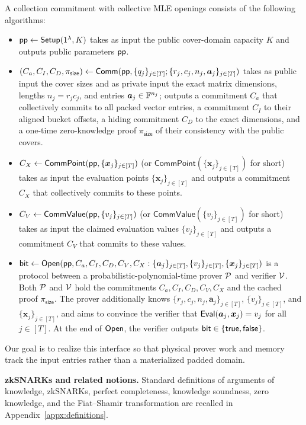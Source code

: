 \begin{definition}
\label{def:collectioncommit}
A collection commitment with collective MLE openings consists of the following
algorithms:
\begin{itemize}[leftmargin=*, labelsep=0.5em]
\item ${\sf pp} \leftarrow {\sf Setup}(1^\lambda, K)$
takes as input the public cover-domain capacity $K$
and outputs public parameters ${\sf pp}$.
\item $(C_a,C_I,C_D,\pi_{\mathsf{size}}) \leftarrow
{\sf Comm}({\sf pp},\{q_j\}_{j\in[T]};\{r_j,c_j,n_j,\bm{a}_j\}_{j\in[T]})$
takes as public input the cover sizes and as private input the exact matrix
dimensions, lengths $n_j=r_jc_j$, and entries
$\bm{a}_j\in{\mathbb{F}}^{n_j}$;
outputs a commitment $C_a$ that collectively commits to all packed vector
entries, a commitment $C_I$ to their aligned bucket offsets, a hiding
commitment $C_D$ to the exact dimensions, and a one-time zero-knowledge proof
$\pi_{\mathsf{size}}$ of their consistency with the public covers.
\item $C_X \leftarrow \mathsf{CommPoint}({\sf pp}, \{\bm{x}_j\}_{j\in[T]})$
(or $\mathsf{CommPoint}(\{\bm{x}_j\}_{j\in[T]})$ for short)
takes as input the evaluation points $\{\bm{x}_j\}_{j\in[T]}$
and outputs a commitment $C_X$ that collectively commits to these points.
\item $C_V \leftarrow \mathsf{CommValue}({\sf pp}, \{v_j\}_{j\in[T]})$
(or $\mathsf{CommValue}(\{v_j\}_{j\in[T]})$ for short)
takes as input the claimed evaluation values $\{v_j\}_{j\in[T]}$
and outputs a commitment $C_V$ that commits to these values.
\item $\mathsf{bit} \leftarrow
{\sf Open}({\sf pp}, C_a, C_I, C_D, C_V, C_X:
\{\bm{a}_j\}_{j\in[T]},
\{v_j\}_{j\in[T]},
\{\bm{x}_j\}_{j\in[T]})$
is a protocol between a probabilistic-polynomial-time prover $\mathcal{P}$
and verifier $\mathcal{V}$.
Both $\mathcal{P}$ and $\mathcal{V}$ hold the commitments
$C_a, C_I, C_D, C_V, C_X$ and the cached proof $\pi_{\mathsf{size}}$.
The prover additionally knows
$\{r_j,c_j,n_j,\bm{a}_j\}_{j\in[T]}$, $\{v_j\}_{j\in[T]}$, and
$\{\bm{x}_j\}_{j\in[T]}$,
and aims to convince the verifier that
 ${\sf Eval}(\bm{a}_j, \bm{x}_j) = v_j$ for all $j \in [T]$.
At the end of ${\sf Open}$, the verifier outputs
$\mathsf{bit} \in \{{\sf true}, {\sf false}\}$.
\end{itemize}
\end{definition}

Our goal is to realize this interface so that physical prover work and memory
track the input entries rather than a materialized padded domain.

\mysmallskip
\noindent
\textbf{zkSNARKs and related notions.}
Standard definitions of arguments of knowledge,
zkSNARKs,
perfect completeness,
knowledge soundness,
zero knowledge,
and the Fiat--Shamir transformation
are recalled in Appendix~\ref{appx:definitions}.
